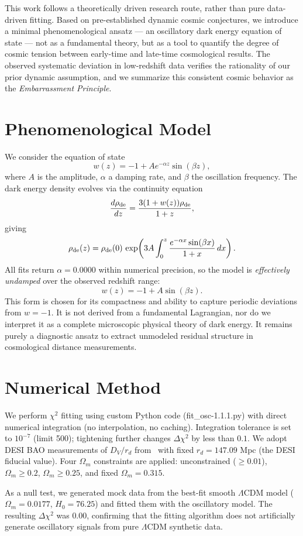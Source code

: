 \documentclass[10pt,a4paper]{article}
\begin{document}
This work follows a theoretically driven research route, rather than pure data-driven fitting. Based on pre-established dynamic cosmic conjectures, we introduce a minimal phenomenological ansatz — an oscillatory dark energy equation of state — not as a fundamental theory, but as a tool to quantify the degree of cosmic tension between early-time and late-time cosmological results. The observed systematic deviation in low-redshift data verifies the rationality of our prior dynamic assumption, and we summarize this consistent cosmic behavior as the \emph{Embarrassment Principle}.

\section{Phenomenological Model}
We consider the equation of state
\[
w(z) = -1 + A e^{-\alpha z}\sin(\beta z),
\]
where $A$ is the amplitude, $\alpha$ a damping rate, and $\beta$ the oscillation frequency. The dark energy density evolves via the continuity equation
\[
\frac{d\rho_{\rm de}}{dz} = \frac{3(1+w(z))\rho_{\rm de}}{1+z},
\]
giving
\[
\rho_{\rm de}(z) = \rho_{\rm de}(0)\,\exp\!\left(3A\int_0^z \frac{e^{-\alpha x}\sin(\beta x)}{1+x}\,dx\right).
\]
All fits return $\alpha=0.0000$ within numerical precision, so the model is \emph{effectively undamped} over the observed redshift range:
\[
w(z) = -1 + A\sin(\beta z).
\]
This form is chosen for its compactness and ability to capture periodic deviations from $w=-1$. It is not derived from a fundamental Lagrangian, nor do we interpret it as a complete microscopic physical theory of dark energy. It remains purely a diagnostic ansatz to extract unmodeled residual structure in cosmological distance measurements.

\section{Numerical Method}
We perform $\chi^2$ fitting using custom Python code (fit\_osc-1.1.1.py) with direct numerical integration (no interpolation, no caching). Integration tolerance is set to $10^{-7}$ (limit 500); tightening further changes $\Delta\chi^2$ by less than $0.1$. We adopt DESI BAO measurements of $D_V/r_d$ from~\cite{DESI2024} with fixed $r_d=147.09$ Mpc (the DESI fiducial value). Four $\Omega_m$ constraints are applied: unconstrained ($\ge0.01$), $\Omega_m\ge0.2$, $\Omega_m\ge0.25$, and fixed $\Omega_m=0.315$.

As a null test, we generated mock data from the best-fit smooth $\Lambda$CDM model ($\Omega_m=0.0177$, $H_0=76.25$) and fitted them with the oscillatory model. The resulting $\Delta\chi^2$ was $0.00$, confirming that the fitting algorithm does not artificially generate oscillatory signals from pure $\Lambda$CDM synthetic data.
\end{document}
